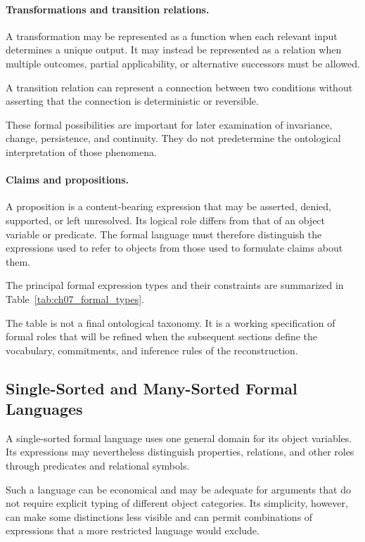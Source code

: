 \paragraph{Transformations and transition relations.}

A transformation may be represented
as a function when each relevant
input determines a unique output.
It may instead be represented as
a relation when multiple outcomes,
partial applicability, or alternative
successors must be allowed.

A transition relation can represent
a connection between two conditions
without asserting that the connection
is deterministic or reversible.

These formal possibilities are
important for later examination
of invariance, change, persistence,
and continuity. They do not
predetermine the ontological
interpretation of those phenomena.

\paragraph{Claims and propositions.}

A proposition is a content-bearing
expression that may be asserted,
denied, supported, or left unresolved.
Its logical role differs from that
of an object variable or predicate.
The formal language must therefore
distinguish the expressions used
to refer to objects from those
used to formulate claims about them.

The principal formal expression
types and their constraints are
summarized in Table~\ref{tab:ch07_formal_types}.



The table is not a final ontological
taxonomy. It is a working specification
of formal roles that will be refined
when the subsequent sections define
the vocabulary, commitments, and
inference rules of the reconstruction.

\subsection{Single-Sorted and Many-Sorted Formal Languages}

A single-sorted formal language uses
one general domain for its object
variables. Its expressions may
nevertheless distinguish properties,
relations, and other roles through
predicates and relational symbols.

Such a language can be economical
and may be adequate for arguments
that do not require explicit typing
of different object categories.
Its simplicity, however, can make
some distinctions less visible and
can permit combinations of expressions
that a more restricted language
would exclude.


